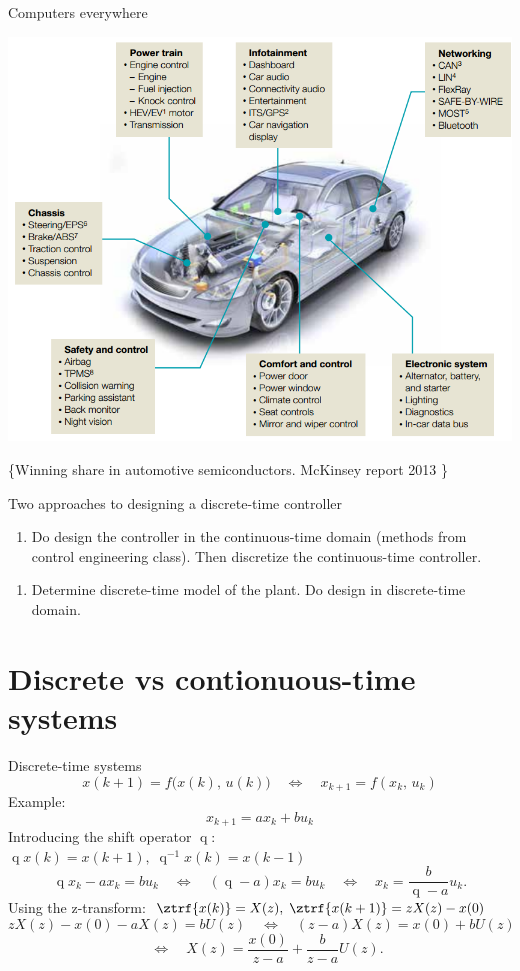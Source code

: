 \documentclass[presentation,aspectratio=169]{beamer}
\newcommand*{\shift}{\ensuremath{\operatorname{q}}}
\begin{document}
\begin{frame}[label={sec:org194c76e}]{Computers everywhere}
\begin{center}
\includegraphics[width=0.7\linewidth]{../../figures/electronics-in-cars.png}
\end{center}
\begin{LaTeX}
\{\tiny Winning share in automotive semiconductors. McKinsey report 2013 \} 
\end{LaTeX}
\end{frame}

\begin{frame}[label={sec:org2716160}]{Two approaches to designing a  discrete-time controller}
\begin{enumerate}
\item Do design the controller in the continuous-time domain (methods from control engineering class). Then discretize the continuous-time controller.
\end{enumerate}
\pause
\begin{enumerate}
\item Determine discrete-time model of the plant. Do design in discrete-time domain.
\end{enumerate}
\end{frame}

\section{Discrete vs contionuous-time systems}
\label{sec:org11b8392}
\begin{frame}[label={sec:org024dd44}]{Discrete-time systems}
\[ x(k+1) = f\big(x(k),\, u(k)\big) \quad\Leftrightarrow\quad x_{k+1} = f(x_k,\, u_k)\]
\pause
Example:
\[ x_{k+1} = ax_k + bu_k \]
\pause
Introducing the shift operator \shift: \(\shift x(k) = x(k+1), \; \shift^{-1}x(k) = x(k-1)\)
\pause
\[ \shift x_k - ax_k = bu_k \quad\Leftrightarrow\quad (\shift - a)x_k = bu_k \quad\Leftrightarrow\quad x_k = \frac{b}{\shift-a} u_k. \]
\pause
Using the z-transform: \(\ztrf{x(k)} = X(z), \; \ztrf{x(k+1)} = zX(z) - x(0)\)
\pause
\[  zX(z) - x(0) - aX(z) = bU(z) \quad\Leftrightarrow\quad (z - a)X(z) = x(0) + bU(z)\]
\[ \quad\Leftrightarrow\quad X(z) = \frac{x(0)}{z-a}  + \frac{b}{z-a}U(z). \]
\end{frame}
\end{document}
